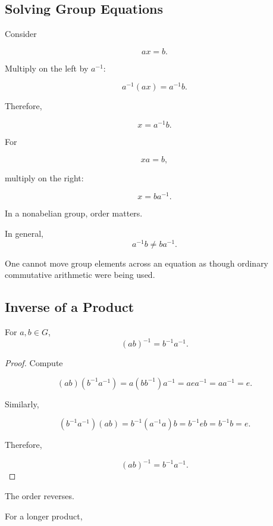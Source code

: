 \subsection{Solving Group Equations}
\label{subsec:solving-group-equations}

Consider

\[ ax=b. \]

Multiply on the left by \(a^{-1}\):

\[ a^{-1}(ax)=a^{-1}b. \]

Therefore,

\[ x=a^{-1}b. \]

For

\[ xa=b, \]

multiply on the right:

\[ x=ba^{-1}. \]

\begin{warningbox}
In a nonabelian group, order matters.

In general,
\[ a^{-1}b\neq ba^{-1}. \]

One cannot move group elements across an equation as though ordinary
commutative arithmetic were being used.
\end{warningbox}

\subsection{Inverse of a Product}
\label{subsec:inverse-product-group}

\begin{theorem}
For \(a,b\in G\),
\[ (ab)^{-1}=b^{-1}a^{-1}. \]
\end{theorem}

\begin{proof}
Compute

\[ (ab)(b^{-1}a^{-1})=a(bb^{-1})a^{-1}=aea^{-1}=aa^{-1}=e. \]

Similarly,

\[ (b^{-1}a^{-1})(ab)=b^{-1}(a^{-1}a)b=b^{-1}eb=b^{-1}b=e. \]

Therefore,

\[ (ab)^{-1}=b^{-1}a^{-1}. \]
\end{proof}

The order reverses.

For a longer product,

